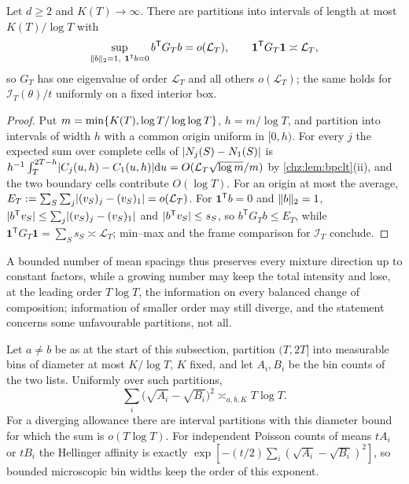 \begin{theorem}\label{chz:thm:collapse}
Let $d\ge2$ and $K(T)\to\infty$. There are partitions into intervals of length at most $K(T)/\log T$ with
\[
 \sup_{\lVert b\rVert_2=1,\ \mathbf 1^{\mathsf T}b=0}b^{\mathsf T}G_Tb=o(\mathcal L_T),\qquad \mathbf 1^{\mathsf T}G_T\mathbf 1\asymp\mathcal L_T ,
\]
so $G_T$ has one eigenvalue of order $\mathcal L_T$ and all others $o(\mathcal L_T)$; the same holds for $\mathcal I_T(\theta)/t$
uniformly on a fixed interior box.
\end{theorem}

\begin{proof}
Put $m=\min\{K(T),\log T/\log\log T\}$, $h=m/\log T$, and partition into intervals of width $h$ with a common origin
uniform in $[0,h)$. For every $j$ the expected sum over complete cells of $\lvert N_j(S)-N_1(S)\rvert$ is
$h^{-1}\int_T^{2T-h}\lvert C_j(u,h)-C_1(u,h)\rvert\mathrm{d} u=O(\mathcal L_T\sqrt{\log m}/m)$ by \cref{chz:lem:bpclt}(ii), and the two boundary
cells contribute $O(\log T)$. For an origin at most the average,
$E_T:=\sum_S\sum_j\lvert(v_S)_j-(v_S)_1\rvert=o(\mathcal L_T)$. For $\mathbf 1^{\mathsf T}b=0$ and $\lVert b\rVert_2=1$,
$\lvert b^{\mathsf T}v_S\rvert\le\sum_j\lvert(v_S)_j-(v_S)_1\rvert$ and $\lvert b^{\mathsf T}v_S\rvert\le s_S$, so $b^{\mathsf T}G_Tb\le E_T$, while
$\mathbf 1^{\mathsf T}G_T\mathbf 1=\sum_Ss_S\asymp\mathcal L_T$; min--max and the frame comparison for $\mathcal I_T$ conclude.
\end{proof}

A bounded number of mean spacings thus preserves every mixture direction up to constant factors, while a growing
number may keep the total intensity and lose, at the leading order $T\log T$, the information on every balanced
change of composition; information of smaller order may still diverge, and the statement concerns some
unfavourable partitions, not all.

\begin{corollary}\label{chz:cor:hellinger}
Let $a\ne b$ be as at the start of this subsection, partition $(T,2T]$ into measurable bins of diameter at most
$K/\log T$, $K$ fixed, and let $A_i,B_i$ be the bin counts of the two lists. Uniformly over such partitions,
\[
 \sum_i\bigl(\sqrt{A_i}-\sqrt{B_i}\bigr)^2\asymp_{a,b,K}T\log T .
\]
For a diverging allowance there are interval partitions with this diameter bound for which the sum is
$o(T\log T)$. For independent Poisson counts of means $tA_i$ or $tB_i$ the Hellinger affinity is exactly
$\exp[-(t/2)\sum_i(\sqrt{A_i}-\sqrt{B_i})^2]$, so bounded microscopic bin widths keep the order of this exponent.
\end{corollary}

